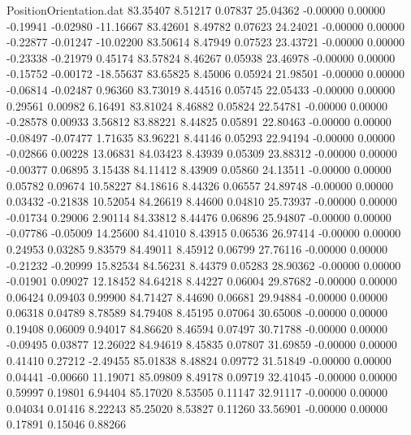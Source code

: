 \begin{filecontents}{PositionOrientation.dat}
  83.35407    8.51217    0.07837    25.04362   -0.00000    0.00000   -0.19941   -0.02980  -11.16667
  83.42601    8.49782    0.07623    24.24021   -0.00000    0.00000   -0.22877   -0.01247  -10.02200
  83.50614    8.47949    0.07523    23.43721   -0.00000    0.00000   -0.23338   -0.21979    0.45174
  83.57824    8.46267    0.05938    23.46978   -0.00000    0.00000   -0.15752   -0.00172  -18.55637
  83.65825    8.45006    0.05924    21.98501   -0.00000    0.00000   -0.06814   -0.02487    0.96360
  83.73019    8.44516    0.05745    22.05433   -0.00000    0.00000    0.29561    0.00982    6.16491
  83.81024    8.46882    0.05824    22.54781   -0.00000    0.00000   -0.28578    0.00933    3.56812
  83.88221    8.44825    0.05891    22.80463   -0.00000    0.00000   -0.08497   -0.07477    1.71635
  83.96221    8.44146    0.05293    22.94194   -0.00000    0.00000   -0.02866    0.00228   13.06831
  84.03423    8.43939    0.05309    23.88312   -0.00000    0.00000   -0.00377    0.06895    3.15438
  84.11412    8.43909    0.05860    24.13511   -0.00000    0.00000    0.05782    0.09674   10.58227
  84.18616    8.44326    0.06557    24.89748   -0.00000    0.00000    0.03432   -0.21838   10.52054
  84.26619    8.44600    0.04810    25.73937   -0.00000    0.00000   -0.01734    0.29006    2.90114
  84.33812    8.44476    0.06896    25.94807   -0.00000    0.00000   -0.07786   -0.05009   14.25600
  84.41010    8.43915    0.06536    26.97414   -0.00000    0.00000    0.24953    0.03285    9.83579
  84.49011    8.45912    0.06799    27.76116   -0.00000    0.00000   -0.21232   -0.20999   15.82534
  84.56231    8.44379    0.05283    28.90362   -0.00000    0.00000   -0.01901    0.09027   12.18452
  84.64218    8.44227    0.06004    29.87682   -0.00000    0.00000    0.06424    0.09403    0.99900
  84.71427    8.44690    0.06681    29.94884   -0.00000    0.00000    0.06318    0.04789    8.78589
  84.79408    8.45195    0.07064    30.65008   -0.00000    0.00000    0.19408    0.06009    0.94017
  84.86620    8.46594    0.07497    30.71788   -0.00000    0.00000   -0.09495    0.03877   12.26022
  84.94619    8.45835    0.07807    31.69859   -0.00000    0.00000    0.41410    0.27212   -2.49455
  85.01838    8.48824    0.09772    31.51849   -0.00000    0.00000    0.04441   -0.00660   11.19071
  85.09809    8.49178    0.09719    32.41045   -0.00000    0.00000    0.59997    0.19801    6.94404
  85.17020    8.53505    0.11147    32.91117   -0.00000    0.00000    0.04034    0.01416    8.22243
  85.25020    8.53827    0.11260    33.56901   -0.00000    0.00000    0.17891    0.15046    0.88266

\end{filecontents}
